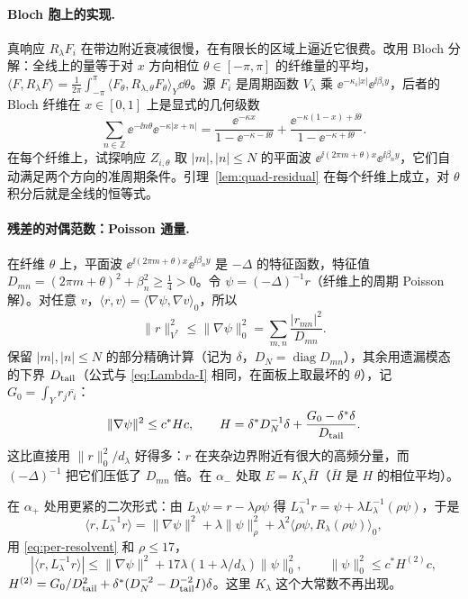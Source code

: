 \documentclass[11pt,a4paper,fontset=fandol]{ctexart}
\begin{document}
\paragraph{Bloch 胞上的实现.} 真响应 $R_\lambda F_i$ 在带边附近衰减很慢，在有限长的区域上逼近它很费。改用 Bloch 分解：全线上的量等于对 $x$ 方向相位 $\theta\in[-\pi,\pi]$ 的纤维量的平均，$\langle F,R_\lambda F\rangle=\frac1{2\pi}\int_{-\pi}^{\pi}\langle F_\theta,R_{\lambda,\theta}F_\theta\rangle_Y\dd\theta$。源 $F_i$ 是周期函数 $V_\lambda$ 乘 $\ee^{-\kappa_i|x|}\ee^{\ii\beta_iy}$，后者的 Bloch 纤维在 $x\in[0,1]$ 上是显式的几何级数
\begin{equation}
\label{eq:bloch-source}
\sum_{n\in\mathbb Z}\ee^{-\ii n\theta}\ee^{-\kappa|x+n|}=\frac{\ee^{-\kappa x}}{1-\ee^{-\kappa-\ii\theta}}+\frac{\ee^{-\kappa(1-x)+\ii\theta}}{1-\ee^{-\kappa+\ii\theta}} .
\end{equation}
在每个纤维上，试探响应 $Z_{i,\theta}$ 取 $|m|,|n|\le N$ 的平面波 $\ee^{\ii(2\pi m+\theta)x}\ee^{\ii\beta_ny}$，它们自动满足两个方向的准周期条件。引理~\ref{lem:quad-residual} 在每个纤维上成立，对 $\theta$ 积分后就是全线的恒等式。

\paragraph{残差的对偶范数：Poisson 通量.} 在纤维 $\theta$ 上，平面波 $\ee^{\ii(2\pi m+\theta)x}\ee^{\ii\beta_ny}$ 是 $-\Delta$ 的特征函数，特征值 $D_{mn}=(2\pi m+\theta)^2+\beta_n^2\ge\tfrac14>0$。令 $\psi=(-\Delta)^{-1}r$（纤维上的周期 Poisson 解）。对任意 $v$，$\langle r,v\rangle=\langle\nabla\psi,\nabla v\rangle_0$，所以
\[
\|r\|_{V^*}^2\le\|\nabla\psi\|_0^2=\sum_{m,n}\frac{|r_{mn}|^2}{D_{mn}} .
\]
保留 $|m|,|n|\le N$ 的部分精确计算（记为 $\delta$，$D_N=\operatorname{diag}D_{mn}$），其余用遗漏模态的下界 $D_{\rm tail}$（公式与 \eqref{eq:Lambda-I} 相同，在面板上取最坏的 $\theta$），记 $G_0=\int_Yr_j\overline{r_i}$：
\[
\|\nabla\psi\|^2\le c^*Hc,\qquad H=\delta^*D_N^{-1}\delta+\frac{G_0-\delta^*\delta}{D_{\rm tail}} .
\]
这比直接用 $\|r\|_0^2/d_\lambda$ 好得多：$r$ 在夹杂边界附近有很大的高频分量，而 $(-\Delta)^{-1}$ 把它们压低了 $D_{mn}$ 倍。在 $\alpha_-$ 处取 $E=K_\lambda\bar H$（$\bar H$ 是 $H$ 的相位平均）。

在 $\alpha_+$ 处用更紧的二次形式：由 $L_\lambda\psi=r-\lambda\rho\psi$ 得 $L_\lambda^{-1}r=\psi+\lambda L_\lambda^{-1}(\rho\psi)$，于是
\[
\langle r,L_\lambda^{-1}r\rangle=\|\nabla\psi\|^2+\lambda\|\psi\|_\rho^2+\lambda^2\langle\rho\psi,R_\lambda(\rho\psi)\rangle_0,
\]
用 \eqref{eq:per-resolvent} 和 $\rho\le17$，
\[
|\langle r,L_\lambda^{-1}r\rangle|\le\|\nabla\psi\|^2+17\lambda(1+\lambda/d_\lambda)\|\psi\|_0^2,\qquad \|\psi\|_0^2\le c^*H^{(2)}c,
\]
$H^{(2)}=G_0/D_{\rm tail}^2+\delta^*(D_N^{-2}-D_{\rm tail}^{-2}I)\delta$。这里 $K_\lambda$ 这个大常数不再出现。
\end{document}
